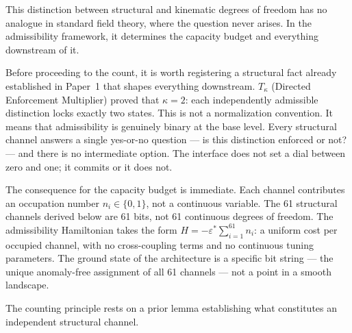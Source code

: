 \documentclass[11pt]{article}
\begin{document}
This distinction between structural and kinematic degrees of freedom has no analogue in standard field theory, where the question never arises.  In the admissibility framework, it determines the capacity budget and everything downstream of it.

Before proceeding to the count, it is worth registering a structural fact already established in Paper~1 that shapes everything downstream.  $T_\kappa$ (Directed Enforcement Multiplier) proved that $\kappa = 2$: each independently admissible distinction locks exactly two states.  This is not a normalization convention.  It means that admissibility is genuinely binary at the base level.  Every structural channel answers a single yes-or-no question --- is this distinction enforced or not? --- and there is no intermediate option.  The interface does not set a dial between zero and one; it commits or it does not.

The consequence for the capacity budget is immediate.  Each channel contributes an occupation number $n_i \in \{0,1\}$, not a continuous variable.  The 61 structural channels derived below are 61 bits, not 61 continuous degrees of freedom.  The admissibility Hamiltonian takes the form $H = -\varepsilon^* \sum_{i=1}^{61} n_i$: a uniform cost per occupied channel, with no cross-coupling terms and no continuous tuning parameters.  The ground state of the architecture is a specific bit string --- the unique anomaly-free assignment of all 61 channels --- not a point in a smooth landscape.

The counting principle rests on a prior lemma establishing what constitutes an independent structural channel.
\end{document}
